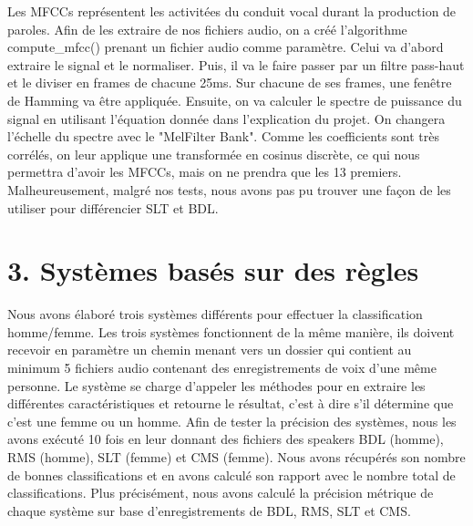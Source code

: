 \documentclass[a4paper,12pt]{report}	%
\begin{document}
Les MFCCs représentent les activitées du conduit vocal durant la production de paroles. Afin de les extraire de nos fichiers audio, on a créé l'algorithme compute\_mfcc() prenant un fichier audio comme paramètre. Celui va d'abord extraire le signal et le normaliser. Puis, il va le faire passer par un filtre pass-haut et le diviser en frames de chacune 25ms. Sur chacune de ses frames, une fenêtre de Hamming va être appliquée. Ensuite, on va calculer le spectre de puissance du signal en utilisant l'équation donnée dans l'explication du projet. On changera l'échelle du spectre avec le "Mel\-Filter Bank". Comme les coefficients sont très corrélés, on leur applique une transformée en cosinus discrète, ce qui nous permettra d'avoir les MFCCs, mais on ne prendra que les 13 premiers.
Malheureusement, malgré nos tests, nous avons pas pu trouver une façon de les utiliser pour différencier SLT et BDL.
	
\newpage
{\section*{3. Systèmes basés sur des règles}}
Nous avons élaboré trois systèmes différents pour effectuer la classification homme/femme. Les trois systèmes fonctionnent de la même manière, ils doivent recevoir en paramètre un chemin menant vers un dossier qui contient au minimum 5 fichiers audio contenant des enregistrements de voix d'une même personne. Le système se charge d'appeler les méthodes pour en extraire les différentes caractéristiques et retourne le résultat, c'est à dire s'il détermine que c'est une femme ou un homme. Afin de tester la précision des systèmes, nous les avons exécuté 10 fois en leur donnant des fichiers des speakers BDL (homme), RMS (homme), SLT (femme) et CMS (femme). Nous avons récupérés son nombre de bonnes classifications et en avons calculé son rapport avec le nombre total de classifications. Plus précisément, nous avons calculé la précision métrique de chaque système sur base d'enregistrements de BDL, RMS, SLT et CMS.
\end{document}
